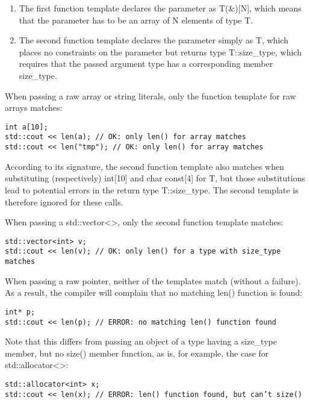\begin{enumerate}
\item 
The first function template declares the parameter as T(\&)[N], which means that the parameter has to be an array of N elements of type T.

\item 
The second function template declares the parameter simply as T, which places no constraints on the parameter but returns type T::size\_type, which requires that the passed argument type has a corresponding member size\_type.
\end{enumerate}

When passing a raw array or string literals, only the function template for raw arrays matches:

\begin{lstlisting}[style=styleCXX]
int a[10];
std::cout << len(a); // OK: only len() for array matches
std::cout << len("tmp"); // OK: only len() for array matches
\end{lstlisting}

According to its signature, the second function template also matches when substituting (respectively) int[10] and char const[4] for T, but those substitutions lead to potential errors in the return type T::size\_type. The second template is therefore ignored for these calls.

When passing a std::vector<>, only the second function template matches:

\begin{lstlisting}[style=styleCXX]
std::vector<int> v;
std::cout << len(v); // OK: only len() for a type with size_type matches
\end{lstlisting}

When passing a raw pointer, neither of the templates match (without a failure). As a result, the compiler will complain that no matching len() function is found:

\begin{lstlisting}[style=styleCXX]
int* p;
std::cout << len(p); // ERROR: no matching len() function found
\end{lstlisting}

Note that this differs from passing an object of a type having a size\_type member, but no size() member function, as is, for example, the case for std::allocator<>:

\begin{lstlisting}[style=styleCXX]
std::allocator<int> x;
std::cout << len(x); // ERROR: len() function found, but can’t size()
\end{lstlisting}

